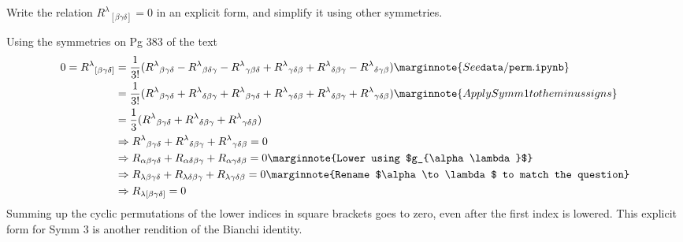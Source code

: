 \documentclass[10pt]{article}
\begin{document}
\begin{example}\label{b3e13}
	Write the relation $R^\lambda{}_{[\beta\gamma\delta]}=0$ in an explicit form, and simplify it using other symmetries.
\end{example}
\sol Using the symmetries on Pg 383 of the text
$$
\begin{aligned}
	0=R^\lambda{}_{[\beta\gamma\delta]} &= \frac{1}{3!} \p{
		R^\lambda{}_{\beta\gamma\delta}
		- R^\lambda{}_{\beta\delta\gamma}
		- R^\lambda{}_{\gamma\beta\delta}
		+ R^\lambda{}_{\gamma\delta\beta}
		+ R^\lambda{}_{\delta\beta\gamma}
		- R^\lambda{}_{\delta\gamma\beta}}\marginnote{See \tt{data/perm.ipynb}}\\
	&= \frac{1}{3!} \p{
		R^\lambda{}_{\beta\gamma\delta}
		+ R^\lambda{}_{\delta\beta\gamma}
		+ R^\lambda{}_{\beta\gamma\delta}
		+ R^\lambda{}_{\gamma\delta\beta}
		+ R^\lambda{}_{\delta\beta\gamma}
		+ R^\lambda{}_{\gamma\delta\beta}}\marginnote{Apply Symm 1 to the minus signs}\\
	&= \frac{1}{3} \p{
		R^\lambda{}_{\beta\gamma\delta}
		+ R^\lambda{}_{\delta\beta\gamma}
		+ R^\lambda{}_{\gamma\delta\beta}}\\
	&\Rightarrow R^\lambda{}_{\beta\gamma\delta} + R^\lambda{}_{\delta\beta\gamma}+ R^\lambda{}_{\gamma\delta\beta}=0\\
	&\Rightarrow R_{\alpha\beta\gamma\delta} + R_{\alpha\delta\beta\gamma}+ R_{\alpha\gamma\delta\beta}=0\marginnote{Lower using $g_{\alpha\lambda}$}\\
	&\Rightarrow R_{\lambda\beta\gamma\delta} + R_{\lambda\delta\beta\gamma}+ R_{\lambda\gamma\delta\beta}=0\marginnote{Rename $\alpha\to\lambda$ to match the question}\\
	&\Rightarrow R_{\lambda[\beta\gamma\delta]}=0
\end{aligned}$$
Summing up the cyclic permutations of the lower indices in square brackets goes to zero, even after the first index is lowered. This explicit form for Symm 3 is another rendition of the Bianchi identity.
\end{document}
